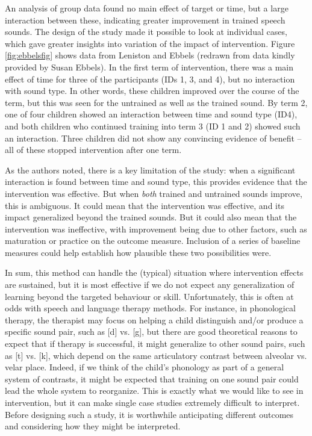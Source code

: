 \documentclass{krantz}
\begin{document}
An analysis of group data found no main effect of target or time, but a large interaction between these, indicating greater improvement in trained speech sounds. The design of the study made it possible to look at individual cases, which gave greater insights into variation of the impact of intervention. Figure \ref{fig:ebbelsfig} shows data from Leniston and Ebbels (redrawn from data kindly provided by Susan Ebbels). In the first term of intervention, there was a main effect of time for three of the participants (IDs 1, 3, and 4), but no interaction with sound type. In other words, these children improved over the course of the term, but this was seen for the untrained as well as the trained sound. By term 2, one of four children showed an interaction between time and sound type (ID4), and both children who continued training into term 3 (ID 1 and 2) showed such an interaction. Three children did not show any convincing evidence of benefit -- all of these stopped intervention after one term.

As the authors noted, there is a key limitation of the study: when a significant interaction is found between time and sound type, this provides evidence that the intervention was effective. But when \emph{both} trained and untrained sounds improve, this is ambiguous. It could mean that the intervention was effective, and its impact generalized beyond the trained sounds. But it could also mean that the intervention was ineffective, with improvement being due to other factors, such as maturation or practice on the outcome measure. Inclusion of a series of baseline measures could help establish how plausible these two possibilities were.

In sum, this method can handle the (typical) situation where intervention effects are sustained, but it is most effective if we do not expect any generalization of learning beyond the targeted behaviour or skill. Unfortunately, this is often at odds with speech and language therapy methods. For instance, in phonological therapy, the therapist may focus on helping a child distinguish and/or produce a specific sound pair, such as {[}d{]} vs. {[}g{]}, but there are good theoretical reasons to expect that if therapy is successful, it might generalize to other sound pairs, such as {[}t{]} vs. {[}k{]}, which depend on the same articulatory contrast between alveolar vs. velar place. Indeed, if we think of the child's phonology as part of a general system of contrasts, it might be expected that training on one sound pair could lead the whole system to reorganize. This is exactly what we would like to see in intervention, but it can make single case studies extremely difficult to interpret. Before designing such a study, it is worthwhile anticipating different outcomes and considering how they might be interpreted.
\end{document}
